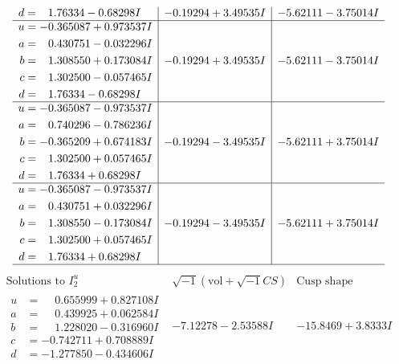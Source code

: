\documentclass[1p]{elsarticle_modified}
\theoremstyle{definition}
\newcommand{\I}{\sqrt{-1}}
\begin{document}
$$\begin{array}{c|c|c}
\begin{aligned}
d &= \phantom{-}1.76334 - 0.68298 I\end{aligned}
 & -0.19294 + 3.49535 I & -5.62111 - 3.75014 I \\ \hline\begin{aligned}
u &= -0.365087 + 0.973537 I \\
a &= \phantom{-}0.430751 - 0.032296 I \\
b &= \phantom{-}1.308550 + 0.173084 I \\
c &= \phantom{-}1.302500 - 0.057465 I \\
d &= \phantom{-}1.76334 - 0.68298 I\end{aligned}
 & -0.19294 + 3.49535 I & -5.62111 - 3.75014 I \\ \hline\begin{aligned}
u &= -0.365087 - 0.973537 I \\
a &= \phantom{-}0.740296 - 0.786236 I \\
b &= -0.365209 + 0.674183 I \\
c &= \phantom{-}1.302500 + 0.057465 I \\
d &= \phantom{-}1.76334 + 0.68298 I\end{aligned}
 & -0.19294 - 3.49535 I & -5.62111 + 3.75014 I \\ \hline\begin{aligned}
u &= -0.365087 - 0.973537 I \\
a &= \phantom{-}0.430751 + 0.032296 I \\
b &= \phantom{-}1.308550 - 0.173084 I \\
c &= \phantom{-}1.302500 + 0.057465 I \\
d &= \phantom{-}1.76334 + 0.68298 I\end{aligned}
 & -0.19294 - 3.49535 I & -5.62111 + 3.75014 I\\
 \hline 
 \end{array}$$\newpage$$\begin{array}{c|c|c}  
\text{Solutions to }I^u_{2}& \I (\text{vol} + \sqrt{-1}CS) & \text{Cusp shape}\\
 \hline 
\begin{aligned}
u &= \phantom{-}0.655999 + 0.827108 I \\
a &= \phantom{-}0.439925 + 0.062584 I \\
b &= \phantom{-}1.228020 - 0.316960 I \\
c &= -0.742711 + 0.708889 I \\
d &= -1.277850 - 0.434606 I\end{aligned}
 & -7.12278 - 2.53588 I & -15.8469 + 3.8333 I \\ \hline\begin{aligned}

\end{aligned}
\end{array}$$
\end{document}
